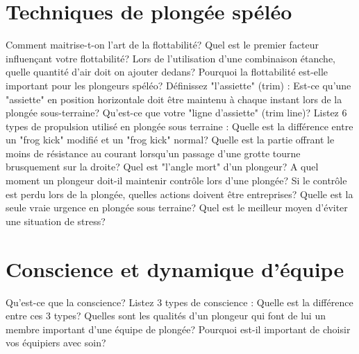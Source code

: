 \documentclass[english,10pt,a4paper]{article}
\begin{document}
	\section{Techniques de plongée spéléo}

	\begin{outline}
		\1 Comment maitrise-t-on l’art de la flottabilité?
		\1 Quel est le premier facteur influençant votre flottabilité?
		\1 Lors de l’utilisation d’une combinaison étanche, quelle quantité d’air doit on ajouter dedans?
		\1 Pourquoi la flottabilité est-elle important pour les plongeurs spéléo?
		\1 Définissez "l’assiette" (trim) :
		\1 Est-ce qu’une "assiette" en position horizontale doit être maintenu à chaque instant lors de la plongée sous-terraine?
		\1 Qu’est-ce que votre "ligne d’assiette" (trim line)?
		\1 Listez 6 types de propulsion utilisé en plongée sous terraine :
		\1 Quelle est la différence entre un "frog kick" modifié et un "frog kick" normal?
		\1 Quelle est la partie offrant le moins de résistance au courant lorsqu’un passage d’une grotte tourne brusquement sur la droite?
		\1 Quel est "l’angle mort" d’un plongeur?
		\1 A quel moment un plongeur doit-il maintenir contrôle lors d’une plongée?
		\1 Si le contrôle est perdu lors de la plongée, quelles actions doivent être entreprises?
		\1 Quelle est la seule vraie urgence en plongée sous terraine?
		\1 Quel est le meilleur moyen d’éviter une situation de stress?
	\end{outline}
	\sectionpage

	\section{Conscience et dynamique d'équipe}

	\begin{outline}
		\1 Qu’est-ce que la conscience?
		\1 Listez 3 types de conscience :
		\1 Quelle est la différence entre ces 3 types?
		\1 Quelles sont les qualités d’un plongeur qui font de lui un membre important d’une équipe de plongée?
		\1 Pourquoi est-il important de choisir vos équipiers avec soin?
	\end{outline}
	\sectionpage

\end{document}
